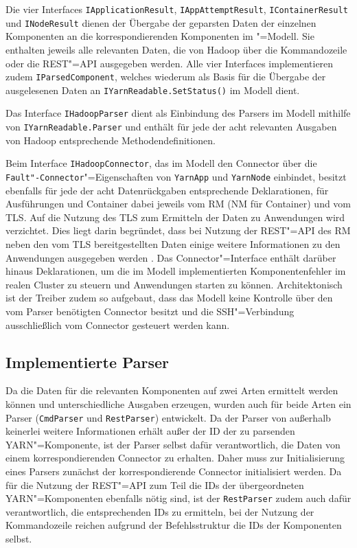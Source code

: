 Die vier Interfaces \texttt{IApplicationResult}, \texttt{IAppAttemptResult}, \texttt{IContainerResult} und \texttt{INodeResult} dienen der Übergabe der geparsten Daten der einzelnen Komponenten an die korrespondierenden Komponenten im \sS"=Modell.
Sie enthalten jeweils alle relevanten Daten, die von Hadoop über die Kommandozeile oder die REST"=API ausgegeben werden.
Alle vier Interfaces implementieren zudem \texttt{IParsedComponent}, welches wiederum als Basis für die Übergabe der ausgelesenen Daten an \texttt{IYarnReadable.SetStatus()} im Modell dient.

Das Interface \texttt{IHadoopParser} dient als Einbindung des Parsers im Modell mithilfe von \texttt{IYarnReadable.Parser} und enthält für jede der acht relevanten Ausgaben von Hadoop entsprechende Methodendefinitionen.

Beim Interface \texttt{IHadoopConnector}, das im Modell den Connector über die \texttt{Fault"-Connector}"=Eigenschaften von \texttt{YarnApp} und \texttt{YarnNode} einbindet, besitzt ebenfalls für jede der acht Datenrückgaben entsprechende Deklarationen, für Ausführungen und Container dabei jeweils vom \ac{RM} (\ac{NM} für Container) und vom \ac{TLS}.
Auf die Nutzung des \ac{TLS} zum Ermitteln der Daten zu Anwendungen wird verzichtet.
Dies liegt darin begründet, dass bei Nutzung der REST"=API des \ac{RM} neben den vom \ac{TLS} bereitgestellten Daten einige weitere Informationen zu den Anwendungen ausgegeben werden \cite{HadoopRmApi271,HadoopYarnTlServer271}.
Das Connector"=Interface enthält darüber hinaus Deklarationen, um die im Modell implementierten Komponentenfehler im realen Cluster zu steuern und Anwendungen starten zu können.
Architektonisch ist der Treiber zudem so aufgebaut, dass das Modell keine Kontrolle über den vom Parser benötigten Connector besitzt und die SSH"=Verbindung ausschließlich vom Connector gesteuert werden kann.

\subsection{Implementierte Parser}
\label{subsec:implementedParsers}

Da die Daten für die relevanten Komponenten auf zwei Arten ermittelt werden können und unterschiedliche Ausgaben erzeugen, wurden auch für beide Arten ein Parser (\texttt{CmdParser} und \texttt{RestParser}) entwickelt.
Da der Parser von außerhalb keinerlei weitere Informationen erhält außer der ID der zu parsenden YARN"=Komponente, ist der Parser selbst dafür verantwortlich, die Daten von einem korrespondierenden Connector zu erhalten.
Daher muss zur Initialisierung eines Parsers zunächst der korrespondierende Connector initialisiert werden.
Da für die Nutzung der REST"=API zum Teil die IDs der übergeordneten YARN"=Komponenten ebenfalls nötig sind, ist der \texttt{RestParser} zudem auch dafür verantwortlich, die entsprechenden IDs zu ermitteln, bei der Nutzung der Kommandozeile reichen aufgrund der Befehlsstruktur die IDs der Komponenten selbst.


